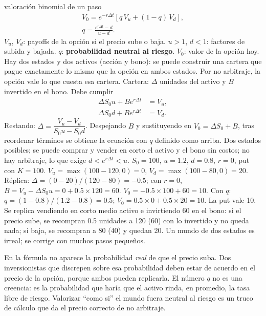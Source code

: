 \begin{ficha}{valoración binomial de un paso}
\begin{gather*}
V_0=e^{-r\Delta t}\left[q\,V_u+(1-q)\,V_d\right],\\
q=\frac{e^{r\Delta t}-d}{u-d}.
\end{gather*}
 $V_u$, $V_d$: payoffs de la opción si el precio sube o baja. $u>1$, $d<1$: factores de subida y bajada. $q$: \textbf{probabilidad neutral al riesgo}. $V_0$: valor de la opción hoy.
 Hay dos estados y dos activos (acción y bono): se puede construir una cartera que pague exactamente lo mismo que la opción en ambos estados. Por no arbitraje, la opción vale lo que cuesta esa cartera.
 Cartera: $\Delta$ unidades del activo y $B$ invertido en el bono. Debe cumplir
\begin{align*}
\Delta S_0u+Be^{r\Delta t}&=V_u,\\
\Delta S_0d+Be^{r\Delta t}&=V_d.
\end{align*}
Restando: $\Delta=\dfrac{V_u-V_d}{S_0u-S_0d}$. Despejando $B$ y sustituyendo en $V_0=\Delta S_0+B$, tras reordenar términos se obtiene la ecuación con $q$ definido como arriba.
 Dos estados posibles; se puede comprar y vender en corto el activo y el bono sin costos; no hay arbitraje, lo que exige $d<e^{r\Delta t}<u$.
 $S_0=100$, $u=1.2$, $d=0.8$, $r=0$, put con $K=100$. $V_u=\max(100-120,0)=0$, $V_d=\max(100-80,0)=20$. Réplica: $\Delta=(0-20)/(120-80)=-0.5$; con $r=0$, $B=V_u-\Delta S_0u=0+0.5\times120=60$. $V_0=-0.5\times100+60=10$. Con $q$: $q=(1-0.8)/(1.2-0.8)=0.5$; $V_0=0.5\times0+0.5\times20=10$.
 La put vale 10. Se replica vendiendo en corto medio activo e invirtiendo 60 en el bono: si el precio sube, se recompran 0.5 unidades a 120 (60) con lo invertido y no queda nada; si baja, se recompran a 80 (40) y quedan 20.
 Un mundo de dos estados es irreal; se corrige con muchos pasos pequeños.
\end{ficha}


\begin{importante}
En la fórmula no aparece la probabilidad \emph{real} de que el precio suba. Dos inversionistas que discrepen sobre esa probabilidad deben estar de acuerdo en el precio de la opción, porque ambos pueden replicarla. El número $q$ no es una creencia: es la probabilidad que haría que el activo rinda, en promedio, la tasa libre de riesgo. Valorizar \enquote{como si} el mundo fuera neutral al riesgo es un truco de cálculo que da el precio correcto de no arbitraje.
\end{importante}

